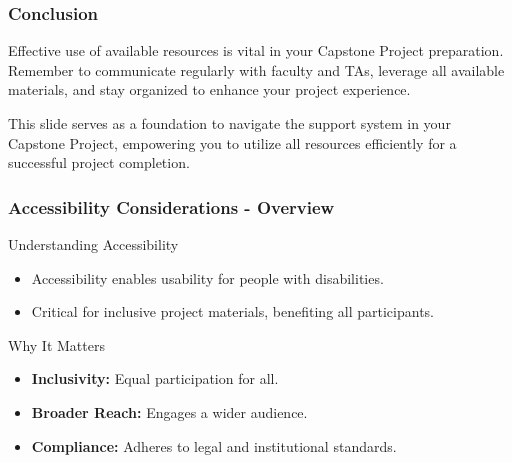 \documentclass[aspectratio=169]{beamer}
\begin{document}
\begin{frame}[fragile]
    \frametitle{Conclusion}
    Effective use of available resources is vital in your Capstone Project preparation. Remember to communicate regularly with faculty and TAs, leverage all available materials, and stay organized to enhance your project experience.

    This slide serves as a foundation to navigate the support system in your Capstone Project, empowering you to utilize all resources efficiently for a successful project completion.
\end{frame}

\begin{frame}[fragile]
    \frametitle{Accessibility Considerations - Overview}
    \begin{block}{Understanding Accessibility}
        \begin{itemize}
            \item Accessibility enables usability for people with disabilities.
            \item Critical for inclusive project materials, benefiting all participants.
        \end{itemize}
    \end{block}
    
    \begin{block}{Why It Matters}
        \begin{itemize}
            \item \textbf{Inclusivity:} Equal participation for all.
            \item \textbf{Broader Reach:} Engages a wider audience.
            \item \textbf{Compliance:} Adheres to legal and institutional standards.
        \end{itemize}
    \end{block}
\end{frame}
\end{document}
